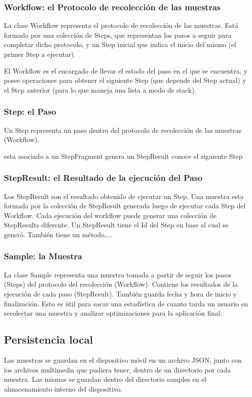 \subsubsection{Workflow: el Protocolo de recolección de las muestras}
La clase Workflow representa el protocolo de recolección de las muestras. Está formado por una colección de Steps, que representan los pasos a seguir para completar dicho protocolo, y un Step inicial que indica el inicio del mismo (el primer Step a ejecutar).

El Workflow es el encargado de llevar el estado del paso en el que se encuentra, y posee operaciones para obtener el siguiente Step (que depende del Step actual) y el Step anterior (para lo que maneja una lista a modo de stack).


\subsubsection{Step: el Paso}
Un Step representa un paso dentro del protocolo de recolección de las muestras (Workflow).

esta asociado a un StepFragment
genera un StepResult
conoce el siguiente Step

\subsubsection{StepResult: el Resultado de la ejecución del Paso}
Los StepResult son el resultado obtenido de ejecutar un Step.
Una muestra esta formada por la colección de StepResult generada luego de ejecutar cada Step del Workflow. Cada ejecución del workflow puede generar una colección de StepResults diferente.
Un StepResult tiene el Id del Step en base al cual se generó. También tiene un método....

\subsubsection{Sample: la Muestra}
La clase Sample representa una muestra tomada a partir de seguir los pasos (Steps) del protocolo del recolección (Workflow). Contiene los resultados de la ejecución de cada paso (StepResult). También guarda fecha y hora de inicio y finalización. Esto es útil para sacar una estadística de cuanto tarda un usuario en recolectar una muestra y analizar optimizaciones para la aplicación final.

\subsection{Persistencia local}
Las muestras se guardan en el dispositivo móvil en un archivo JSON, junto con los archivos multimedia que pudiera tener, dentro de un directorio por cada muestra. Las mismas se guardan dentro del directorio samples en el almacenamiento interno del dispositivo.

